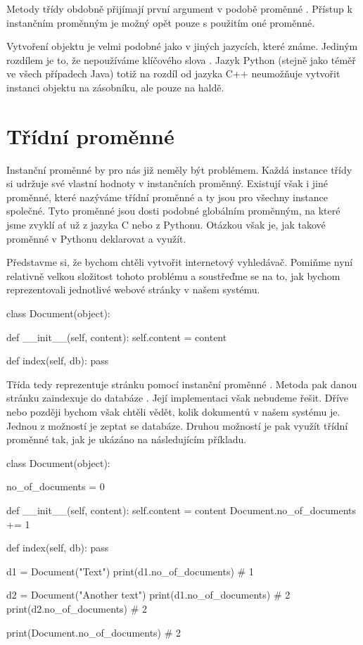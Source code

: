 Metody třídy obdobně přijímají první argument v podobě proměnné . Přístup k instančním proměnným
je možný opět pouze s použitím oné proměnné.

Vytvoření objektu je velmi podobné jako v jiných jazycích, které známe. Jediným rozdílem je to, že
nepoužíváme klíčového slova . Jazyk Python (stejně jako téměř ve všech případech Java)
totiž na rozdíl od jazyka C++ neumožňuje
vytvořit instanci objektu na zásobníku, ale pouze na haldě.

\section{Třídní proměnné}

Instanční proměnné by pro nás již neměly být problémem.
Každá instance třídy si udržuje své vlastní hodnoty v instančních proměnný.
Existují však i jiné proměnné, které nazýváme třídní proměnné a ty jsou pro všechny instance společné.
Tyto proměnné jsou dosti podobné globálním proměnným, na které jsme zvyklí ať už z jazyka C nebo z Pythonu.
Otázkou však je, jak takové proměnné v Pythonu deklarovat a využít.

Představme si, že bychom chtěli vytvořit internetový vyhledávač. Pomiňme nyní relativně velkou složitost
tohoto problému a soustřeďme se na to, jak bychom reprezentovali jednotlivé webové stránky v našem systému.

\begin{python}
class Document(object):
    
    def __init__(self, content):
        self.content = content

    def index(self, db):
        pass
\end{python}

Třída  tedy reprezentuje stránku pomocí instanční proměnné . Metoda 
pak danou stránku zaindexuje do databáze . Její implementaci však nebudeme řešit.
Dříve nebo později bychom však chtěli vědět, kolik dokumentů v našem systému je. Jednou z možností je zeptat
se databáze. Druhou možností je pak využít třídní proměnné tak, jak je ukázáno na následujícím příkladu.

\begin{python}
class Document(object):
    
    no_of_documents = 0

    def __init__(self, content):
        self.content = content
        Document.no_of_documents += 1

    def index(self, db):
        pass

d1 = Document("Text")
print(d1.no_of_documents) # 1

d2 = Document("Another text")
print(d1.no_of_documents) # 2
print(d2.no_of_documents) # 2

print(Document.no_of_documents) # 2
\end{python}


